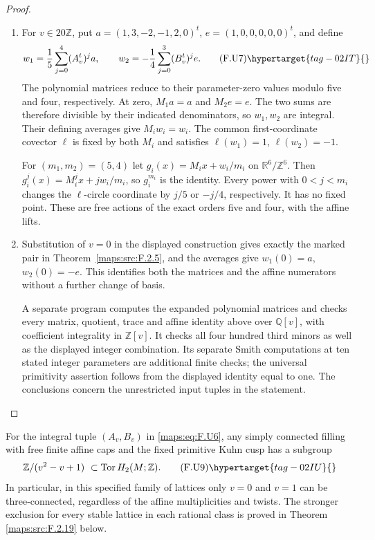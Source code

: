 \begin{proof}
\begin{enumerate}[label={$\langle1\rangle$\arabic*.}]
\item For $v\in20\mathbb Z$, put
$a=(1,3,-2,-1,2,0)^t$, $e=(1,0,0,0,0,0)^t$, and define
\[
 w_1=\frac15\sum_{j=0}^4(A_v^t)^j a,
 \qquad
 w_2=-\frac14\sum_{j=0}^3(B_v^t)^j e.
 \tag{F.U7}\hypertarget{tag-02IT}{}\label{maps:eq:F.U7}
\]
The polynomial matrices reduce to their parameter-zero
values modulo five and four, respectively. At zero,
$M_1a=a$ and $M_2e=e$. The two sums are therefore divisible
by their indicated denominators, so $w_1,w_2$ are integral.
Their defining averages give $M_iw_i=w_i$. The common
first-coordinate covector $\ell$ is fixed by both $M_i$ and
satisfies $\ell(w_1)=1$, $\ell(w_2)=-1$.

For $(m_1,m_2)=(5,4)$ let
$g_i(x)=M_ix+w_i/m_i$ on $\mathbb R^6/\mathbb Z^6$.
Then $g_i^j(x)=M_i^jx+jw_i/m_i$, so $g_i^{m_i}$ is the
identity. Every power with $0<j<m_i$ changes the $\ell$-circle coordinate by $j/5$ or $-j/4$, respectively.
It has no fixed point. These are free actions of the exact
orders five and four, with the affine lifts.

\item Substitution of $v=0$ in the displayed construction gives
exactly the marked pair in Theorem~\ref{maps:src:F.2.5}, and
the averages give $w_1(0)=a$, $w_2(0)=-e$. This identifies
both the matrices and the affine numerators without a further
change of basis.

A separate program computes the expanded polynomial matrices and checks every matrix, quotient, trace
and affine identity above over $\mathbb Q[v]$, with coefficient
integrality in $\mathbb Z[v]$. It checks all four hundred
third minors as well as the displayed integer combination.
Its separate Smith computations at ten stated integer
parameters are additional finite checks; the universal
primitivity assertion follows from the displayed identity
equal to one. The conclusions concern the unrestricted
input tuples in the statement.
\end{enumerate}
\end{proof}




\begin{proposition}\hypertarget{tag-02N6}{}\label{maps:src:F.2.17}


For the integral tuple $(A_v,B_v)$ in \eqref{maps:eq:F.U6}, any simply
connected filling with free finite affine caps and the fixed
primitive Kuhn cusp has a subgroup
\[
 \mathbb Z/(v^2-v+1)\ \subset\operatorname{Tor}H_2(M;\mathbb Z).
 \tag{F.U9}\hypertarget{tag-02IU}{}\label{maps:eq:F.U9}
\]
In particular, in this specified family of lattices only
$v=0$ and $v=1$ can be three-connected, regardless of the
affine multiplicities and twists.  The stronger exclusion for every stable lattice in each
rational class is proved in Theorem \ref{maps:src:F.2.19} below.

\end{proposition}



